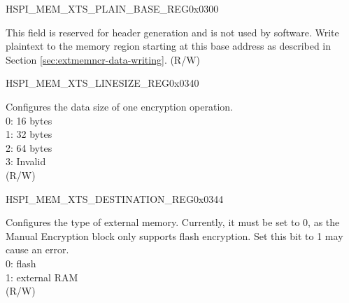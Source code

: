 
\begin{register}{H}{SPI\_MEM\_XTS\_PLAIN\_BASE\_REG}{0x0300}\label{regdesc:SPIMEMXTSPLAINBASEREG}
%
\regnewline%
\begin{regdesc}\begin{reglist}
\label{fielddesc:SPIMEMXTSPLAIN}\item [SPI\_MEM\_XTS\_PLAIN] This field is reserved for header generation and is not used by software. Write plaintext to the memory region starting at this base address as described in Section \ref{sec:extmemncr-data-writing}. (R/W)
\end{reglist}\end{regdesc}
\end{register}



\begin{register}{H}{SPI\_MEM\_XTS\_LINESIZE\_REG}{0x0340}\label{regdesc:SPIMEMXTSLINESIZEREG}
%
%
\regnewline%
\begin{regdesc}\begin{reglist}
\label{fielddesc:SPIMEMXTSLINESIZE}\item [SPI\_MEM\_XTS\_LINESIZE] Configures the data size of one encryption operation. \\
0: 16 bytes\\
1: 32 bytes\\
2: 64 bytes\\
3: Invalid\\
(R/W)
\end{reglist}\end{regdesc}
\end{register}


\begin{register}{H}{SPI\_MEM\_XTS\_DESTINATION\_REG}{0x0344}\label{regdesc:SPIMEMXTSDESTINATIONREG}
%
%
\regnewline%
\begin{regdesc}\begin{reglist}
\label{fielddesc:SPIMEMXTSDESTINATION}\item [SPI\_MEM\_XTS\_DESTINATION] Configures the type of external memory. Currently, it must be set to 0, as the Manual Encryption block only supports flash encryption. Set this bit to 1 may cause an error.\\
0: flash\\
1: external RAM\\
(R/W)
\end{reglist}\end{regdesc}
\end{register}


